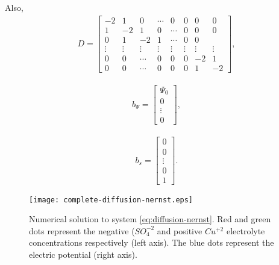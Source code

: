 Also, 
\begin{align}
D = \begin{bmatrix}
    -2   &  1   & 0  &   \cdots & 0   &   0   &   0   &   0 \\
    1    &  -2    & 1   & 0  & \cdots   & 0   &   0   &   0 \\
    0         & 1                    &  -2   & 1 & \cdots    &   0   &   0 \\
    \vdots    &  \vdots              &\vdots          &  \vdots  & \vdots   &\vdots & \vdots & \vdots \\ 
    0         &  0                   &  \cdots        &  0       &  0         &  0         & -2   & 1 \\
0         &  0                   &  \cdots        &  0           &  0         &     0      &  1    &  -2
\end{bmatrix},
\end{align}

\begin{align}
    b_\Psi = \begin{bmatrix}
        \Psi_0\\
        0\\
        \vdots\\
        0
    \end{bmatrix},
\end{align}

\begin{align}
    b_s = \begin{bmatrix}
        0\\
        0\\
        \vdots\\
        0\\
        1\end{bmatrix}.
\end{align}



\begin{figure}[htbp]
\centering
\texttt{[image: complete-diffusion-nernst.eps]}
\caption{Numerical solution to system \ref{eq:diffusion-nernst}. Red and green dots represent the negative ($SO_4^{-2}$ and positive $Cu^{+2}$ electrolyte concentrations respectively (left axis). The blue dots represent the electric potential (right axis).}
\label{fig:diffusion-comparison}
\end{figure}









